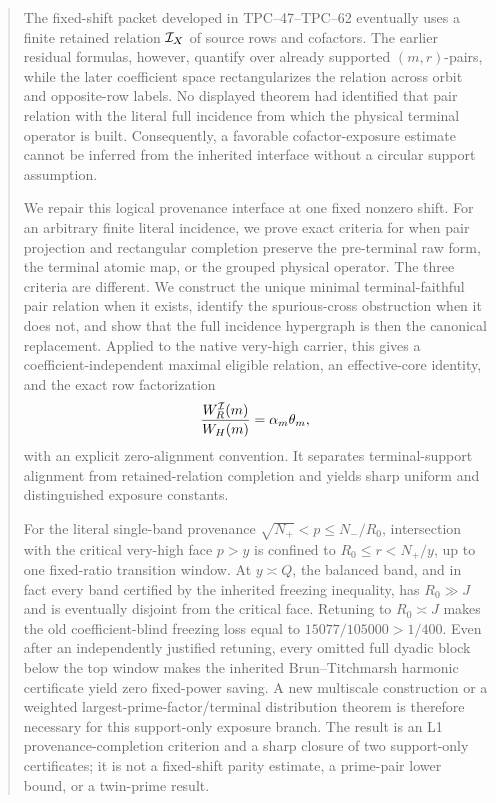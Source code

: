 \begin{abstract}
The fixed-shift packet developed in TPC--47--TPC--62 eventually uses a
finite retained relation \(\cI_X\) of source rows and cofactors.  The
earlier residual formulas, however, quantify over already supported
\((m,r)\)-pairs, while the later coefficient space rectangularizes the
relation across orbit and opposite-row labels.  No displayed theorem had
identified that pair relation with the literal full incidence from which
the physical terminal operator is built.  Consequently, a favorable
cofactor-exposure estimate cannot be inferred from the inherited interface
without a circular support assumption.

We repair this logical provenance interface at one fixed nonzero shift.  For an arbitrary
finite literal incidence, we prove exact criteria for when pair projection
and rectangular completion preserve the pre-terminal raw form, the
terminal atomic map, or the grouped physical operator.  The three criteria
are different.  We construct the unique minimal terminal-faithful pair
relation when it exists, identify the spurious-cross obstruction when it
does not, and show that the full incidence hypergraph is then the canonical
replacement.  Applied to the native very-high carrier, this gives a
coefficient-independent maximal eligible relation, an effective-core
identity, and the exact row factorization
\[
 \frac{W_R^{\cI}(m)}{W_H(m)}
 =\alpha_m\theta_m,
\]
with an explicit zero-alignment convention.
It separates terminal-support alignment from retained-relation completion
and yields sharp uniform and distinguished exposure constants.

For the literal single-band provenance
\(\sqrt{N_+}<p\le N_-/R_0\), intersection with the critical very-high
face \(p>y\) is confined to
\(R_0\le r<N_+/y\), up to one fixed-ratio transition window.  At
\(y\asymp Q\), the balanced band, and in fact every band certified by the
inherited freezing inequality, has \(R_0\gg J\) and is eventually
disjoint from the critical face.  Retuning to \(R_0\asymp J\) makes the
old coefficient-blind freezing loss equal to
\(15077/105000>1/400\).  Even after an independently justified retuning,
every omitted full dyadic block below the top window makes the inherited
Brun--Titchmarsh harmonic certificate yield zero fixed-power saving.  A
new multiscale construction or a weighted largest-prime-factor/terminal
distribution theorem is therefore necessary for this support-only exposure
branch.  The result is an L1 provenance-completion criterion and a sharp closure of two support-only
certificates; it is not a fixed-shift parity estimate, a prime-pair lower
bound, or a twin-prime result.
\end{abstract}
